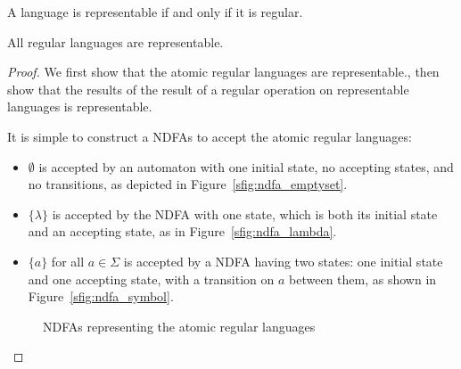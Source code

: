 \documentclass{bcthesis}
\begin{document}
\label{ch:kleenes_theorem}

	\begin{theorem}
		A language is representable if and only if it is regular.
	\end{theorem}

	\begin{claim}
	\label{prop:regular_languages_representable}
		All regular languages are representable.
	\end{claim}
	\begin{proof}
		We first show that the atomic regular languages are representable., then show that the results of the result of a regular operation on representable languages is representable.

		It is simple to construct a NDFAs to accept the atomic regular languages:
		\begin{itemize}
			\item [] $\emptyset$ is accepted by an automaton with one initial state, no accepting states, and no transitions, as depicted in Figure~\ref{sfig:ndfa_emptyset}.
			\item [] $\{ \lambda \}$ is accepted by the NDFA with one state, which is both its initial state and an accepting state, as in Figure~\ref{sfig:ndfa_lambda}.
			\item [] $\{ a \}$ for all $a \in \Sigma$ is accepted by a NDFA having two states: one initial state and one accepting state, with a transition on $a$ between them, as shown in Figure~\ref{sfig:ndfa_symbol}.
		\end{itemize}


		\begin{figure}[H]
			\centering
			\setlength{\fboxrule}{0 pt}
			\caption{NDFAs representing the atomic regular languages}
			\label{fig:ndfa_atomic_regular_languages}
		\end{figure}


\end{proof}
\end{document}
